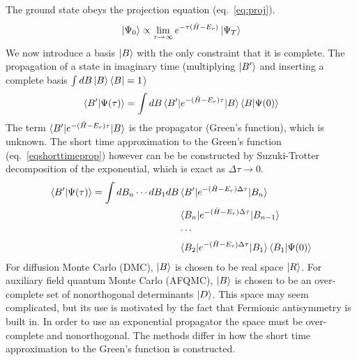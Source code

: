 The ground state obeys the projection equation (eq.~\ref{eq:proj}).
\begin{equation}
\ket{\Psi_0} \propto \lim_{\tau\rightarrow\infty} e^{-\tau (\hat{H} - E_r)} \ket{\Psi_T}
    \label{eq:proj}
\end{equation}
We now introduce a basis $\ket{B}$ with the only constraint that it is complete.
The propagation of a state in imaginary time (multiplying $\ket{B'}$ and inserting a complete basis $\int dB \ket{B}\bra{B} = 1$)
\begin{equation}
\braket{B'|\Psi(\tau)} = \int dB \braket{B'|e^{-(\hat{H}-E_r)\tau}|B}\braket{B|\Psi(0)}
    \label{eqprop}
\end{equation}
The term $\braket{B'|e^{-(\hat{H}-E_r)\tau}|B}$ is the propagator (Green's function), which is unknown. 
The short time approximation to the Green's function (eq.~\ref{eqshorttimeprop}) however can be be constructed by Suzuki-Trotter decomposition of the exponential, which is exact as $\Delta \tau \rightarrow 0$.\cite{Trotter,Suzuki}
\begin{equation}
\begin{aligned}
    \braket{B'|\Psi(\tau)} = \int dB_{n} \cdots dB_{1} dB &\braket{B'|e^{-(\hat{H}-E_r)\Delta\tau}|B_{n}}\\
                                                          &\braket{B_{n}|e^{-(\hat{H}-E_r)\Delta\tau}|B_{n-1}}\\
                                                          &\cdots \\
                                                          &\braket{B_{2}|e^{-(\hat{H}-E_r)\Delta\tau}|B_{1}} \braket{B_{1}|\Psi(0)}
    \label{eqshorttimeprop}
\end{aligned}
\end{equation}
For diffusion Monte Carlo (DMC), $\ket{B}$ is chosen to be real space $\ket{R}$.
For auxiliary field quantum Monte Carlo (AFQMC), $\ket{B}$ is chosen to be an over-complete set of nonorthogonal determinants $\ket{D}$.
This space may seem complicated, but its use is motivated by the fact that Fermionic antisymmetry is built in.
In order to use an exponential propagator the space must be over-complete and nonorthogonal.\cite{Zhang1995,Zhang2003}
The methods differ in how the short time approximation to the Green's function is constructed.


